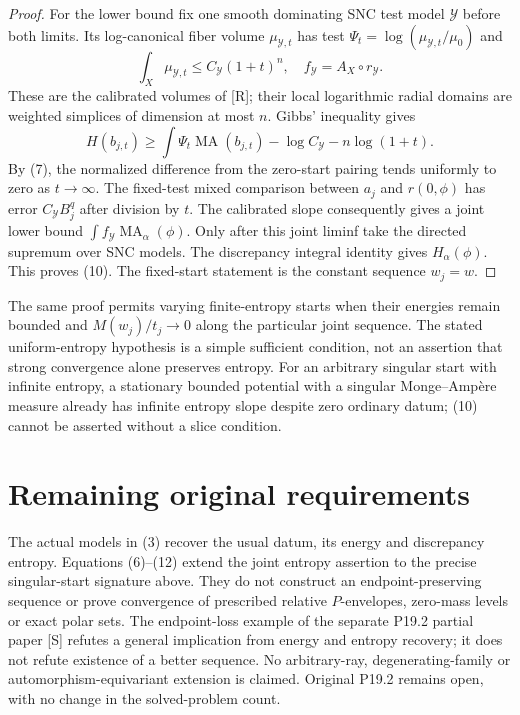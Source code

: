 \documentclass[11pt]{article}
\newcommand{\MA}{\operatorname{MA}}
\begin{document}
\begin{proof}
For the lower bound fix one smooth dominating SNC test model
$\mathcal Y$ before both limits. Its log-canonical fiber volume
$\mu_{\mathcal Y,t}$ has test
$\Psi_t=\log(\mu_{\mathcal Y,t}/\mu_0)$ and
\[
 \int_X\mu_{\mathcal Y,t}\leq C_\mathcal Y(1+t)^n,
 \quad f_\mathcal Y=A_X\circ r_\mathcal Y.
\]
These are the calibrated volumes of [R]; their local logarithmic
radial domains are weighted simplices of dimension at most $n$.
Gibbs' inequality gives
\[
 H(b_{j,t})\geq\int\Psi_t\MA(b_{j,t})
                    -\log C_\mathcal Y-n\log(1+t).      \tag{12}
\]
By (7), the normalized difference from the zero-start pairing tends
uniformly to zero as $t\to\infty$. The fixed-test mixed comparison
between $a_j$ and $r(0,\phi)$ has error $C_\mathcal YB_j^q$ after
division by $t$. The calibrated slope consequently gives a joint
lower bound $\int f_\mathcal Y\MA_\alpha(\phi)$.
Only after this joint liminf take the directed supremum over SNC
models. The discrepancy integral identity gives
$H_\alpha(\phi)$. This proves (10). The fixed-start statement is the
constant sequence $w_j=w$.
\end{proof}

The same proof permits varying finite-entropy starts when their
energies remain bounded and $M(w_j)/t_j\to0$ along the particular
joint sequence. The stated uniform-entropy hypothesis is a simple
sufficient condition, not an assertion that strong convergence alone
preserves entropy. For an arbitrary singular start with infinite
entropy, a stationary bounded potential with a singular
Monge--Amp\`ere measure already has infinite entropy slope despite
zero ordinary datum; (10) cannot be asserted without a slice condition.

\section{Remaining original requirements}
The actual models in (3) recover the usual datum, its energy and
discrepancy entropy. Equations (6)--(12) extend the joint entropy
assertion to the precise singular-start signature above. They do not
construct an endpoint-preserving sequence or prove convergence of
prescribed relative $P$-envelopes, zero-mass levels or exact polar sets.
The endpoint-loss example of the separate P19.2 partial paper [S]
refutes a general implication from energy and entropy recovery; it
does not refute existence of a better sequence. No arbitrary-ray,
degenerating-family or automorphism-equivariant extension is claimed.
Original P19.2 remains open, with no change in the solved-problem count.
\end{document}
